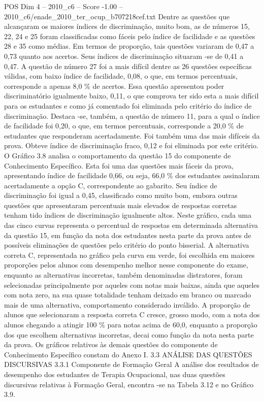 \begin{textsample}{POS Dim 4 – 2010\_c6 – Score -1.00 – 2010\_c6/enade\_2010\_ter\_ocup\_b707218cef.txt}
Dentre as questões que alcançaram os maiores índices de discriminação, muito bom, as de números 15, 22, 24 e 25 foram classificadas como fáceis pelo índice de facilidade e as questões 28 e 35 como médias.
Em termos de proporção, tais questões variaram de 0,47 a 0,73 quanto aos acertos.
Seus índices de discriminação situaram -se de 0,41 a 0,47.
A questão de número 27 foi a mais difícil dentre as 26 questões específicas válidas, com baixo índice de facilidade, 0,08, o que, em termos percentuais, corresponde a apenas 8,0 \% de acertos.
Essa questão apresentou poder discriminatório igualmente baixo, 0,11, o que comprova ter sido esta a mais difícil para os estudantes e como já comentado foi eliminada pelo critério do índice de discriminação.
Destaca -se, também, a questão de número 11, para a qual o índice de facilidade foi 0,20, o que, em termos percentuais, corresponde a 20,0 \% de estudantes que responderam acertadamente.
Foi também uma das mais difíceis da prova.
Obteve índice de discriminação fraco, 0,12 e foi eliminada por este critério.
O Gráfico 3.8 analisa o comportamento da questão 15 do componente de Conhecimento Específico.
Esta foi uma das questões mais fáceis da prova, apresentando índice de facilidade 0,66, ou seja, 66,0 \% dos estudantes assinalaram acertadamente a opção C, correspondente ao gabarito.
Seu índice de discriminação foi igual a 0,45, classificado como muito bom, embora outras questões que apresentaram percentuais mais elevados de respostas corretas tenham tido índices de discriminação igualmente altos.
Neste gráfico, cada uma das cinco curvas representa o percentual de respostas em determinada alternativa da questão 15, em função da nota dos estudantes nesta parte da prova antes de possíveis eliminações de questões pelo critério do ponto bisserial.
A alternativa correta C, representada no gráfico pela curva em verde, foi escolhida em maiores proporções pelos alunos com desempenho melhor nesse componente do exame, enquanto as alternativas incorretas, também denominadas distratores, foram selecionadas principalmente por aqueles com notas mais baixas, ainda que aqueles com nota zero, na sua quase totalidade tenham deixado em branco ou marcado mais de uma alternativa, comportamento considerado inválido.
A proporção de alunos que selecionaram a resposta correta C cresce, grosso modo, com a nota dos alunos chegando a atingir 100 \% para notas acima de 60,0, enquanto a proporção dos que escolhem alternativas incorretas, decai como função da nota nesta parte da prova.
Os gráficos relativos às demais questões do componente de Conhecimento Específico constam do Anexo I. 3.3 ANÁLISE DAS QUESTÕES DISCURSIVAS 3.3.1 Componente de Formação Geral A análise dos resultados de desempenho dos estudantes de Terapia Ocupacional, nas duas questões discursivas relativas à Formação Geral, encontra -se na Tabela 3.12 e no Gráfico 3.9.

\end{textsample}
